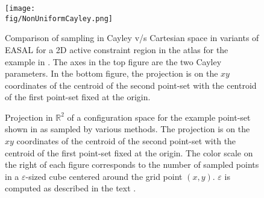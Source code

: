 \begin{table}[h]
\caption{Comparison of EASAL variants with MC with respect to coverage and number
of samples for the two transmembrane helices shown in
 \protect{}. 
Here, $\varepsilon$ is computed as described in the text.}
\label{table:coverage}
\end{table}


\begin{figure}[h]
\centering
\texttt{[image: \\fig/NonUniformCayley.png]}
\caption{Comparison of sampling in Cayley v/s Cartesian space in variants of
EASAL for a 2D active constraint region in the atlas for the example in
 \protect{}. The axes in the top
	figure are the two Cayley parameters. In the bottom figure, 
	the projection is on the $xy$ coordinates of the
centroid of the second point-set with the centroid of the first point-set fixed
at the origin.}
\label{fig:nonuniform}
\end{figure}


\begin{figure}
\centering   %
{}
\caption{Projection in $\mathbb{R}^2$ of a configuration space for the example point-set shown
	in  as sampled by various methods. The
	projection is on the $xy$ coordinates of the centroid of the second
	point-set with the centroid of the first point-set fixed at the origin.
	The color scale on the right of each figure corresponds to the number
	of sampled points in a $\varepsilon$-sized cube centered around the grid
	point $(x, y)$. $\varepsilon$ is computed as described in the text \protect{}.}
\label{fig:projectionview}
\end{figure}




